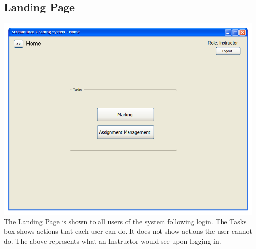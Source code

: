\documentclass{article}
\begin{document}
\subsection{Landing Page}
\includegraphics[scale=0.55]{../images/UIMockups/pngs/LandingPage} 
\label{landPg}\\
The Landing Page is shown to all users of the system following login.  The Tasks
box shows actions that each user can do.  It does not show actions the user
cannot do. The above represents what an Instructor would see upon logging in.
\end{document}
